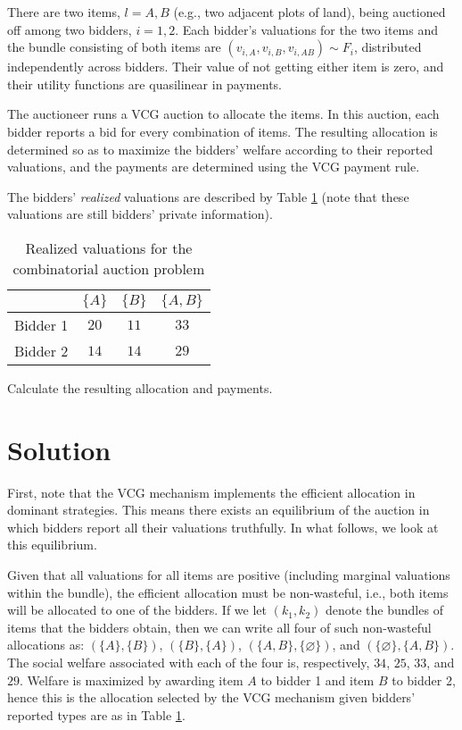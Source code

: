 \documentclass[a4paper]{article}
\newif\ifsolutions
\begin{document}
There are two items, $l=A,B$ (e.g., two adjacent plots of land), being auctioned off among two bidders, $i=1,2$. Each bidder's valuations for the two items and the bundle consisting of both items are $(v_{i,A}, v_{i,B}, v_{i,AB}) \sim F_i$, distributed independently across bidders. Their value of not getting either item is zero, and their utility functions are quasilinear in payments. 

The auctioneer runs a VCG auction to allocate the items. In this auction, each bidder reports a bid for every combination of items. The resulting allocation is determined so as to maximize the bidders' welfare according to their reported valuations, and the payments are determined using the VCG payment rule.

The bidders' \emph{realized} valuations are described by Table \ref{tab:combac} (note that these valuations are still bidders' private information).
\begin{table}[h]
	\begin{center}
		\begin{tabular}{l|c|c|c}
			& $\{A\}$ & $\{B\}$ & $\{A,B\}$  \\ \hline
			Bidder 1 & $20$ & $11$ & $33$ \\
			Bidder 2 & $14$ & $14$ & $29$
		\end{tabular}
	\end{center}
	\caption{Realized valuations for the combinatorial auction problem}
	\label{tab:combac}
\end{table}

Calculate the resulting allocation and payments.

\ifsolutions
\section*{Solution}
First, note that the VCG mechanism implements the efficient allocation in dominant strategies. This means there exists an equilibrium of the auction in which bidders report all their valuations truthfully. In what follows, we look at this equilibrium.

Given that all valuations for all items are positive (including marginal valuations within the bundle), the efficient allocation must be non-wasteful, i.e., both items will be allocated to one of the bidders. If we let $(k_1,k_2)$ denote the bundles of items that the bidders obtain, then we can write all four of such non-wasteful allocations as: $(\{A\},\{B\})$, $(\{B\},\{A\})$, $(\{A,B\},\{\varnothing\})$, and $(\{\varnothing\},\{A,B\})$. The social welfare associated with each of the four is, respectively, $34$, $25$, $33$, and $29$. Welfare is maximized by awarding item $A$ to bidder 1 and item $B$ to bidder 2, hence this is the allocation selected by the VCG mechanism given bidders' reported types are as in Table \ref{tab:combac}.
\end{document}
